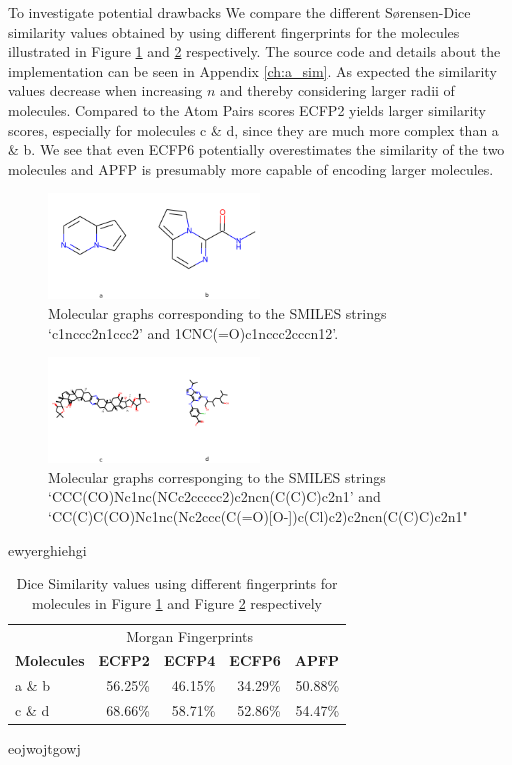 To investigate potential drawbacks We compare the different Sørensen-Dice similarity values \cite{sorensen1948method, dice1945measures} obtained by using different fingerprints for the molecules illustrated in Figure \ref{fig:molsa} and \ref{fig:molsb} respectively. The source code and details about the implementation can be seen in Appendix \ref{ch:a_sim}.   As expected the similarity values decrease when increasing $n$ and thereby considering larger radii of molecules. Compared to the Atom Pairs scores ECFP2 yields larger similarity scores, especially for molecules c \& d, since they are much more complex than a \& b. We see that even ECFP6 potentially overestimates the similarity of the two molecules and APFP is presumably more capable of encoding larger molecules. 
\begin{figure}[h]
	\centering 
	\includegraphics[width=0.5\textwidth]{test1.png}
	\caption{Molecular graphs corresponding to the SMILES strings `c1nccc2n1ccc2' and 1CNC(=O)c1nccc2cccn12'.}
	\label{fig:molsa}
\end{figure}
\begin{figure}[h]
	\centering 
	\includegraphics[width=0.5\textwidth]{test2.png}
	\caption{Molecular graphs corresponging to the SMILES strings `CCC(CO)Nc1nc(NCc2ccccc2)c2ncn(C(C)C)c2n1' and `CC(C)C(CO)Nc1nc(Nc2ccc(C(=O)[O-])c(Cl)c2)c2ncn(C(C)C)c2n1" }
	\label{fig:molsb}
\end{figure}

ewyerghiehgi
\begin{table}[h]
	\centering
	\begin{tabularx}{0.57\textwidth}{l
			r
			r 
			r
			r
		}
		\toprule
		& \multicolumn{3}{c}{Morgan Fingerprints} &   \\
		\cmidrule(r){2-4} 
		\bf{Molecules}  &  \multicolumn{1}{c}{\bf{ECFP2}}   & \multicolumn{1}{c}{\bf{ECFP4}}&  \multicolumn{1}{c}{\bf{ECFP6}} & \multicolumn{1}{c}{\bf{APFP}} \\
		\midrule
		a \& b   & 56.25\%   &  46.15\%  & 34.29\%    & 50.88\%   \\
		
		c \& d   & 68.66\%  &  58.71\% &  52.86\%  & 54.47\% \\
		
		
		\bottomrule
	\end{tabularx}
	
	
	\caption{Dice Similarity values using different fingerprints for molecules in Figure \ref{fig:molsa} and Figure \ref{fig:molsb} respectively}
	\label{tab:dis_metric_2Dshapes}
\end{table}
eojwojtgowj
